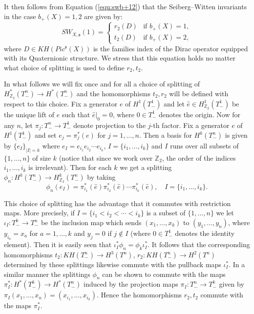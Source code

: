 \documentclass{amsart}
\theoremstyle{definition}
\theoremstyle{remark}
\numberwithin{equation}{section}
\begin{document}
It then follows from Equation (\ref{equ:swb+12}) that the Seiberg--Witten invariants in the case $b_+(X) = 1,2$ are given by:
\begin{equation}\label{equ:sw12}
SW_{X,\mathfrak{s}}(1) = \begin{cases} r_2(D) & \text{if } b_+(X) = 1, \\ t_2(D) & \text{if } b_+(X) =2, \end{cases}
\end{equation}
where $D \in KH( Pic^{\mathfrak{s}}(X) )$ is the families index of the Dirac operator equipped with its Quaternionic structure. We stress that this equation holds no matter what choice of splitting is used to define $r_2,t_2$.

In what follows we will fix once and for all a choice of splitting of $H^*_{\mathbb{Z}_2}( T^n_-) \to H^*( T^n_-)$ and the homomorphisms $t_2, r_2$ will be defined with respect to this choice. Fix a generator $e$ of $H^1(T^1_-)$ and let $\hat{e} \in H^1_{\mathbb{Z}_2}( T^1_-)$ be the unique lift of $e$ such that $\hat{e}|_{0} = 0$, where $0 \in T^1_-$ denotes the origin. Now for any $n$, let $\pi_j : T^n_- \to T^1_-$ denote projection to the $j$-th factor. Fix a generator $e$ of $H^1(T^1_-)$ and set $e_j = \pi_j^*(e)$ for $j=1,\dots , n$. Then a basis for $H^k( T^n_-)$ is given by $\{ e_I \}_{|I| = k}$ where $e_I = e_{i_1} e_{i_2} \cdots e_{i_k}$, $I = \{ i_1, \dots , i_k\}$ and $I$ runs over all subsets of $\{1, \dots , n\}$ of size $k$ (notice that since we work over $\mathbb{Z}_2$, the order of the indices $i_1, \dots , i_k$ is irrelevant). Then for each $k$ we get a splitting $\phi_n : H^k( T^n_-) \to H^k_{\mathbb{Z}_2}( T^n_-)$ by taking
\[
\phi_n( e_I ) = \pi^*_{i_1}( \hat{e} ) \pi^*_{i_2}(\hat{e}) \cdots \pi^*_{i_k}( \hat{e} ), \quad I = \{i_1, \dots , i_k\}.
\]

This choice of splitting has the advantage that it commutes with restriction maps. More precisely, if $I = \{ i_1 < i_2 < \cdots < i_k\}$ is a subset of $\{1, \dots , n\}$ we let $\iota_I : T^k_- \to T^n_-$ be the inclusion map which sends $(x_1, \dots , x_k)$ to $(y_1, \dots , y_n)$, where $y_{i_a} = x_a$ for $a=1, \dots , k$ and $y_j = 0$ if $j \notin I$ (where $0 \in T^1_-$ denotes the identity element). Then it is easily seen that $\iota_I^* \phi_n = \phi_k \iota_I^*$. It follows that the corresponding homomorphisms $t_2 : KH(T^n_-) \to H^3(T^n)$, $r_2 : KH(T^n_-) \to H^2(T^n)$ determined by these splittings likewise commute with the pullback maps $\iota_I^*$. In a similar manner the splittings $\phi_n$ can be shown to commute with the maps $\pi_I^* : H^*(T^k_-) \to H^*(T^n_-)$ induced by the projection maps $\pi_I : T^n_- \to T^k_-$ given by $\pi_I(x_1, \dots , x_n) = (x_{i_1} , \dots , x_{i_k})$. Hence the homomorphisms $r_2,t_2$ commute with the maps $\pi_I^*$.
\end{document}
